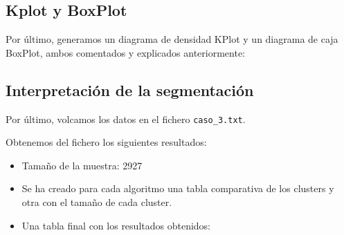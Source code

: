 	
	\begin{figure}[H]
		\centering
		
	\end{figure}

	\newpage

	\subsection{Kplot y BoxPlot}
	
	Por último, generamos un diagrama de densidad KPlot y un diagrama de caja BoxPlot, ambos comentados y explicados anteriormente:

	
	\begin{figure}[H]
		\centering
		
	\end{figure}
	
	
	
	\begin{figure}[H]
		\centering
		
	\end{figure}
	
	
	
	\newpage
	
	\subsection{Interpretación de la segmentación}
	
	Por último, volcamos los datos en el fichero \texttt{caso\_3.txt}.
	
	Obtenemos del fichero los siguientes resultados:
	
	\begin{itemize}
		\item Tamaño de la muestra: 2927
		\item Se ha creado para cada algoritmo una tabla comparativa de los clusters y otra con el tamaño de cada cluster.
		\item Una tabla final con los resultados obtenidos:
	\end{itemize}
	
